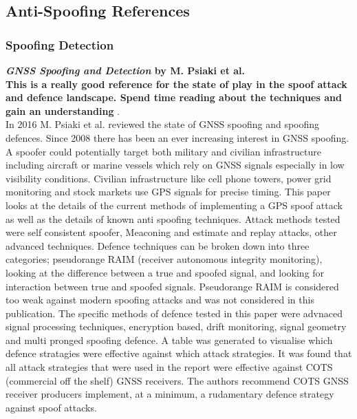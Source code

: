 \medskip

\subsection{Anti-Spoofing References}
\subsubsection{Spoofing Detection}

\textbf{\emph{GNSS Spoofing and Detection} by M. Psiaki et al.} \\
\textbf{This is a really good reference for the state of play in the spoof attack and defence landscape. Spend time reading about the techniques and 
gain an understanding} .\\
In 2016 M. Psiaki et al. \cite{RN12} reviewed the state of GNSS spoofing and spoofing defences. Since 2008 there has been an ever increasing 
interest in GNSS spoofing. A spoofer could potentially target both military and civilian infrastructure including aircraft or marine vessels which
rely on GNSS signals especially in low visibility conditions. Civilian infrastructure like cell phone towers, power grid monitoring and stock markets
use GPS signals for precise timing. This paper looks at the details of the current methods of implementing a GPS spoof attack as well as the details
of known anti spoofing techniques. Attack methods tested were self consistent spoofer, Meaconing and estimate and replay attacks, other advanced techniques.
Defence techniques can be broken down into three categories; pseudorange RAIM (receiver autonomous integrity monitoring),
looking at the difference between a true and spoofed signal, and looking for interaction between true and spoofed signals. Pseudorange RAIM is considered
too weak against modern spoofing attacks and was not considered in this publication. The specific methods of defence tested in this paper  
were advnaced signal processing techniques, encryption based, drift monitoring, signal geometry and multi pronged spoofing defence.
A table was generated to visualise which defence stratagies were effective against which attack strategies. 
It was found that all attack strategies that were used in the report were effective against COTS (commercial off the shelf) GNSS receivers. The authors
recommend COTS GNSS receiver producers implement, at a minimum, a rudamentary defence strategy against spoof attacks. 

